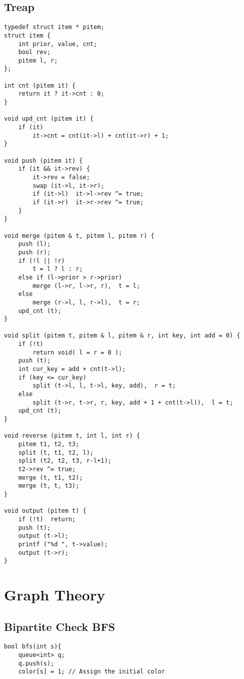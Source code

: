 \documentclass[10pt]{article}
\begin{document}
\begin{multicols*}{2}
\subsection{Treap}

\begin{lstlisting}[style=compactcpp]
typedef struct item * pitem;
struct item {
    int prior, value, cnt;
    bool rev;
    pitem l, r;
};

int cnt (pitem it) {
    return it ? it->cnt : 0;
}

void upd_cnt (pitem it) {
    if (it)
        it->cnt = cnt(it->l) + cnt(it->r) + 1;
}

void push (pitem it) {
    if (it && it->rev) {
        it->rev = false;
        swap (it->l, it->r);
        if (it->l)  it->l->rev ^= true;
        if (it->r)  it->r->rev ^= true;
    }
}

void merge (pitem & t, pitem l, pitem r) {
    push (l);
    push (r);
    if (!l || !r)
        t = l ? l : r;
    else if (l->prior > r->prior)
        merge (l->r, l->r, r),  t = l;
    else
        merge (r->l, l, r->l),  t = r;
    upd_cnt (t);
}

void split (pitem t, pitem & l, pitem & r, int key, int add = 0) {
    if (!t)
        return void( l = r = 0 );
    push (t);
    int cur_key = add + cnt(t->l);
    if (key <= cur_key)
        split (t->l, l, t->l, key, add),  r = t;
    else
        split (t->r, t->r, r, key, add + 1 + cnt(t->l)),  l = t;
    upd_cnt (t);
}

void reverse (pitem t, int l, int r) {
    pitem t1, t2, t3;
    split (t, t1, t2, l);
    split (t2, t2, t3, r-l+1);
    t2->rev ^= true;
    merge (t, t1, t2);
    merge (t, t, t3);
}

void output (pitem t) {
    if (!t)  return;
    push (t);
    output (t->l);
    printf ("%d ", t->value);
    output (t->r);
}
\end{lstlisting}


\section{Graph Theory}

\subsection{Bipartite Check BFS}
\begin{lstlisting}[style=compactcpp]
bool bfs(int s){
    queue<int> q;
    q.push(s);
    color[s] = 1; // Assign the initial color
 

\end{lstlisting}
\end{multicols*}
\end{document}
